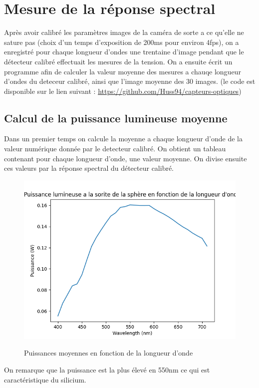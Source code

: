 \documentclass{article}
\begin{document}
\section{Mesure de la réponse spectral}
Après avoir calibré les paramètres images de la caméra de sorte a ce qu'elle ne sature pas (choix d'un temps d'exposition de 200ms pour environ 4fps), on a enregistré pour chaque longueur d'ondes une trentaine d'image pendant que le détecteur calibré effectuait les mesures de la tension.
On a ensuite écrit un programme afin de calculer la valeur moyenne des mesures a chauqe longueur d'ondes du deteceur calibré, ainsi que l'image moyenne des 30 images. (le code est disponible sur le lien suivant : \url{https://github.com/Huss94/capteurs-optiques})

\subsection{Calcul de la puissance lumineuse moyenne}
Dans un premier temps on calcule la moyenne a chaque longueur d'onde de la valeur numérique donnée par le detecteur calibré. On obtient un tableau contenant pour chaque longueur d'onde, une valeur moyenne.
On divise ensuite ces valeurs par la réponse spectral du détecteur calibré.
\begin{figure}[H]
\centering
\includegraphics[scale=0.7]{puissacnes.png}
\label{fig:mosaique}
\caption{Puissances moyennes en fonction de la longueur d'onde}
\end{figure}

On remarque que la puissance est la plus élevé en 550nm ce qui est caractéristique du silicium.
\end{document}
